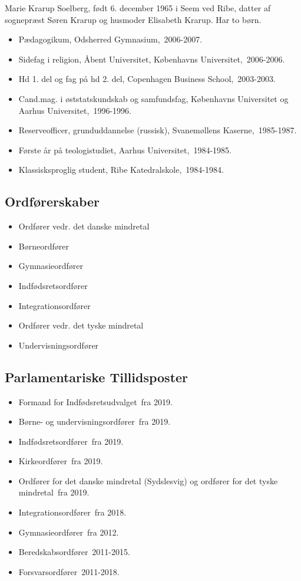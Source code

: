 \documentclass[11pt, a4paper]{awesome-cv}
\begin{document}
\makecvheader[R]
\makelettertitle
\begin{cvletter}
Marie Krarup Soelberg, født 6. december 1965 i Seem ved Ribe, datter af sognepræst Søren Krarup og husmoder Elisabeth Krarup. Har to børn.

\begin{itemize}
\item Pædagogikum, Odsherred Gymnasium, 2006-2007.
\item Sidefag i religion, Åbent Universitet, Københavns Universitet, 2006-2006.
\item Hd 1. del og fag på hd 2. del, Copenhagen Business School, 2003-2003.
\item Cand.mag. i øststatskundskab og samfundsfag, Københavns Universitet og Aarhus Universitet, 1996-1996.
\item Reserveofficer, grunduddannelse (russisk), Svanemøllens Kaserne, 1985-1987.
\item Første år på teologistudiet, Aarhus Universitet, 1984-1985.
\item Klassisksproglig student, Ribe Katedralskole, 1984-1984.
\end{itemize}
\subsection*{Ordførerskaber}
\begin{itemize}
\item Ordfører vedr. det danske mindretal
\item Børneordfører
\item Gymnasieordfører
\item Indfødsretsordfører
\item Integrationsordfører
\item Ordfører vedr. det tyske mindretal
\item Undervisningsordfører
\end{itemize}
\subsection*{Parlamentariske Tillidsposter}
\begin{itemize}
\item Formand for Indfødsretsudvalget fra 2019.
\item Børne- og undervisningsordfører fra 2019.
\item Indfødsretsordfører fra 2019.
\item Kirkeordfører fra 2019.
\item Ordfører for det danske mindretal (Sydslesvig) og ordfører for det tyske mindretal fra 2019.
\item Integrationsordfører fra 2018.
\item Gymnasieordfører fra 2012.
\item Beredskabsordfører 2011-2015.
\item Forsvarsordfører 2011-2018.
\end{itemize}

\end{cvletter}
\end{document}
